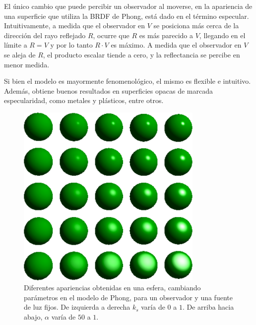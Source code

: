 El único cambio que puede percibir un observador al moverse, en la apariencia de una superficie que utiliza la BRDF de Phong, está dado en el término especular.
Intuitivamente, a medida que el observador en $V$ se posiciona más cerca de la dirección del rayo reflejado $R$, ocurre que $R$ es más parecido a $V$, llegando en el límite a $R = V$
y por lo tanto $R \cdot V$ es máximo.
A medida que el observador en $V$ se aleja de $R$, el producto escalar tiende a cero, y la reflectancia se percibe en menor medida.

Si bien el modelo es mayormente fenomenológico, el mismo es flexible e intuitivo.
Además, obtiene buenos resultados en superficies opacas de marcada especularidad, como metales y plásticos, entre otros.

\begin{figure}
\center
\includegraphics[width=9cm]{figures/phongparametros}
\caption[Diferentes apariencias en el modelo de Phong]{Diferentes apariencias obtenidas en una esfera, cambiando parámetros en el modelo de Phong, para un observador y una fuente de luz fijos. De izquierda a derecha $k_{s}$ varía de $0$ a $1$. De arriba hacia abajo, $\alpha$ varía de $50$ a $1$.}
\label{fg:phongparametros}
\end{figure}



